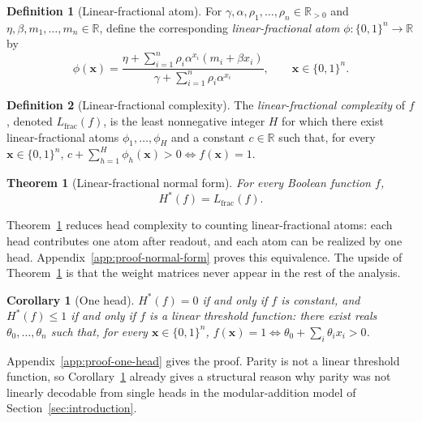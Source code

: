 \documentclass{article}
\newtheorem{theorem}{Theorem}
\theoremstyle{definition}
\newtheorem{definition}{Definition}
\theoremstyle{plain}
\newtheorem{corollary}{Corollary}
\newcommand{\hstar}{H^{\ast}}
\newcommand{\bits}{\{0,1\}}
\begin{document}
\begin{definition}[Linear-fractional atom]
\label{def:atom}
For $\gamma,\alpha,\rho_1,\ldots,\rho_n\in\mathbb{R}_{>0}$ and $\eta,\beta,m_1,\ldots,m_n\in\mathbb{R}$, define the corresponding \emph{linear-fractional atom} $\phi:\bits^n\to\mathbb{R}$ by
\begin{equation}
\phi(\mathbf{x})=
\frac{\eta+\sum_{i=1}^{n}\rho_i\alpha^{x_i}(m_i+\beta x_i)}
{\gamma+\sum_{i=1}^{n}\rho_i\alpha^{x_i}},
\qquad \mathbf{x}\in\bits^n.
\label{eq:frac-atom}
\end{equation}
\end{definition}
\smallskip

\begin{definition}[Linear-fractional complexity]
\label{def:lfrac}The \emph{linear-fractional complexity} of $f$, denoted $L_{\mathrm{frac}}(f)$, is the least nonnegative integer $H$ for which there exist linear-fractional atoms $\phi_1,\ldots,\phi_H$ and a constant $c\in\mathbb{R}$ such that, for every $\mathbf{x}\in\bits^n$, $c+\sum_{h=1}^{H}\phi_h(\mathbf{x})>0 \Longleftrightarrow f(\mathbf{x})=1$.
\end{definition}
\smallskip

\begin{theorem}[Linear-fractional normal form]
\label{thm:normal-form}
For every Boolean function $f$,
\begin{equation*}
\hstar(f)=L_{\mathrm{frac}}(f).
\end{equation*}
\end{theorem}
Theorem~\ref{thm:normal-form} reduces head complexity to counting linear-fractional atoms: each head contributes one atom after readout, and each atom can be realized by one head. Appendix~\ref{app:proof-normal-form} proves this equivalence. The upside of Theorem~\ref{thm:normal-form} is that the weight matrices never appear in the rest of the analysis.

\begin{corollary}[One head]
\label{cor:one-head}
$\hstar(f)=0$ if and only if $f$ is constant, and $\hstar(f)\leq1$ if and only if $f$ is a linear threshold function: there exist reals $\theta_0,\ldots,\theta_n$ such that, for every $\mathbf{x}\in\bits^n$, $f(\mathbf{x})=1 \Longleftrightarrow \theta_0+\sum_i\theta_ix_i>0$.
\end{corollary}
Appendix~\ref{app:proof-one-head} gives the proof. Parity is not a linear threshold function, so Corollary~\ref{cor:one-head} already gives a structural reason why parity was not linearly decodable from single heads in the modular-addition model of Section~\ref{sec:introduction}.
\end{document}
